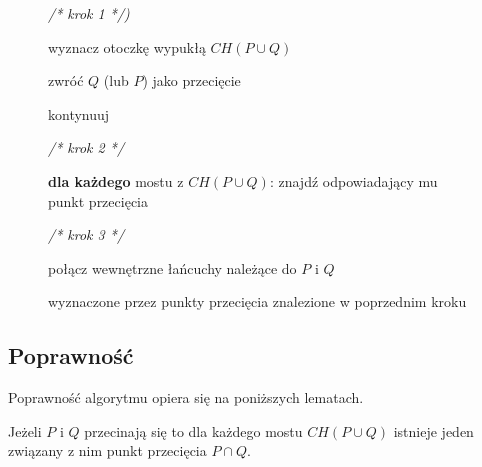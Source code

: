 \begin{figure}[htp]
  \begin{algorithmic}[1]

    \State \emph{/* krok 1 */)}

    \State wyznacz otoczkę wypukłą $CH(P \cup Q)$

    \State

    \State zwróć $Q$ (lub $P$) jako przecięcie

    \Else
    \State kontynuuj
    \EndIf

    \State

    \State \emph{/* krok 2 */}

    \State \textbf{dla każdego} mostu z $CH(P \cup Q)$:
    \State \hspace{\algorithmicindent} znajdź odpowiadający mu punkt
    przecięcia

    \State

    \State \emph{/* krok 3 */}

    \State połącz wewnętrzne łańcuchy należące do $P$ i $Q$

    wyznaczone przez punkty przecięcia znalezione w poprzednim kroku

    \EndProcedure
  \end{algorithmic}
  \caption{\label{alg:interconpol}}
\end{figure}


\subsection{Poprawność}
Poprawność algorytmu opiera się na poniższych lematach.

\begin{lemat}
  Jeżeli $P$ i $Q$ przecinają się to dla każdego mostu $CH(P \cup Q)$
  istnieje jeden związany z nim punkt przecięcia $P \cap Q$.
\end{lemat}

